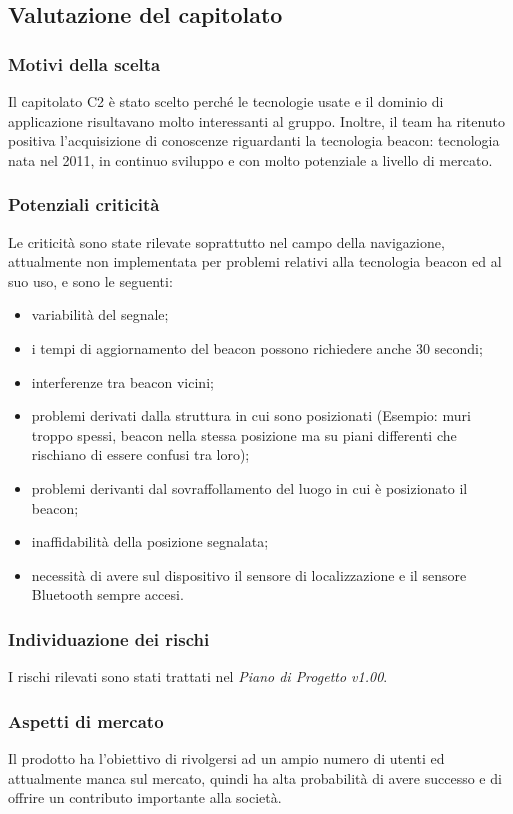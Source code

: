 \documentclass[../StudioDiFattibilita.tex]{subfiles}
\begin{document}
	\subsection{Valutazione del capitolato}
		\subsubsection{Motivi della scelta}
		Il capitolato C2 è stato scelto perché le tecnologie usate e il dominio di applicazione risultavano molto interessanti al gruppo.
		Inoltre, il team ha ritenuto positiva l'acquisizione di conoscenze riguardanti la tecnologia beacon: tecnologia nata nel 2011, in continuo sviluppo e con molto potenziale a livello di mercato.
		\subsubsection{Potenziali criticità}
		Le criticità sono state rilevate soprattutto nel campo della navigazione, attualmente non implementata per problemi relativi alla tecnologia beacon ed al suo uso, e sono le seguenti:
			\begin{itemize}
				\item variabilità del segnale;
				\item i tempi di aggiornamento del beacon possono richiedere anche 30 secondi;
				\item interferenze tra beacon vicini;
				\item problemi derivati dalla struttura in cui sono posizionati (Esempio: muri troppo spessi, beacon nella stessa posizione ma su piani differenti che rischiano di essere confusi tra loro);
				\item problemi derivanti dal sovraffollamento del luogo in cui è posizionato il beacon;
				\item inaffidabilità della posizione segnalata;
				\item necessità di avere sul dispositivo il sensore di localizzazione e il sensore Bluetooth sempre accesi.
			\end{itemize}
		\subsubsection{Individuazione dei rischi}
		I rischi rilevati sono stati trattati nel \textit{Piano di Progetto v1.00}.
		\subsubsection{Aspetti di mercato}
		Il prodotto ha l'obiettivo di rivolgersi ad un ampio numero di utenti ed attualmente manca sul mercato, quindi ha alta probabilità di avere successo e di offrire un contributo importante alla società.
\end{document}
